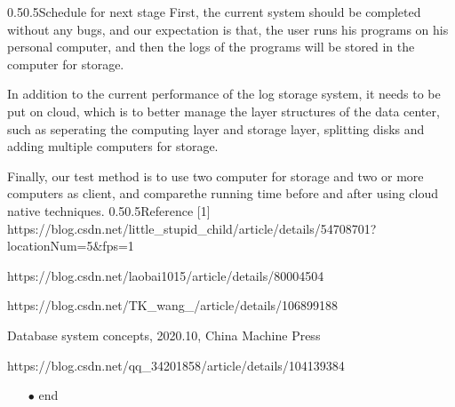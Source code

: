 \documentclass[UTF8, 11pt, twocolumn]{ctexart}
\makeatletter
\renewcommand{\section}{\@startsection{section}{1}{0mm}
  {0.5\baselineskip}{0.5\baselineskip}{\bf\leftline}}
\makeatother
\begin{document}
    \section{Schedule for next stage}
        First, the current system should be completed without any bugs, and our expectation is that, the user runs his programs on his personal computer, and then 
        the logs of the programs will be stored in the computer for storage. \par
        In addition to the current performance of the log storage system, it needs to be put on cloud, which is to better manage the layer structures of the 
        data center, such as seperating the computing layer and storage layer, splitting disks and adding multiple computers for storage. \par
        Finally, our test method is to use two computer for storage and two or more computers as client, and comparethe running time before and after using cloud 
        native techniques.
    \section{Reference}
        [1] https://blog.csdn.net/little_stupid_child/article/details/54708701?locationNum=5&fps=1 \par
        [2] https://blog.csdn.net/laobai1015/article/details/80004504 \par
        [3] https://blog.csdn.net/TK_wang_/article/details/106899188 \par
        [4] Database system concepts, 2020.10, China Machine Press \par
        [5] https://blog.csdn.net/qq_34201858/article/details/104139384 \par
        
    \begin{itemize}
        \item[$\bullet$] end
    \end{itemize}
\end{document}
